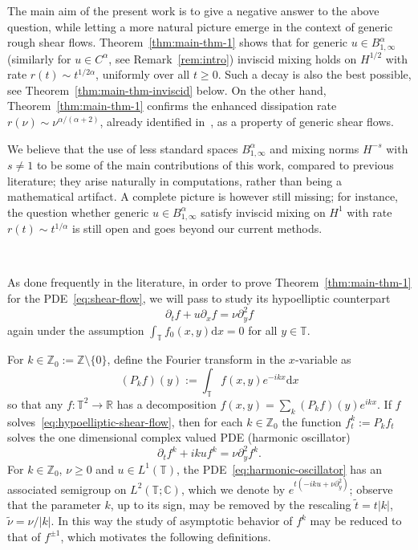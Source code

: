 \documentclass[11pt,oneside,reqno]{amsart}
\newcommand{\assign}{:=}
\newcommand{\mathd}{\mathrm{d}}
\newcommand{\tmtextbf}[1]{\text{{\bfseries{#1}}}}
\numberwithin{equation}{section}
\begin{document}
The main aim of the present work is to give a negative answer to the above
question, while letting a more natural picture emerge in the context of
generic rough shear flows. Theorem~\ref{thm:main-thm-1} shows that for generic
$u \in B^{\alpha}_{1, \infty}$ (similarly for $u \in C^{\alpha}$, see
Remark~\ref{rem:intro}) inviscid mixing holds on $H^{1 / 2}$
with rate $r (t) \sim t^{1 / 2 \alpha}$, uniformly over all $t \geqslant 0$.
Such a decay is also the best possible, see
Theorem~\ref{thm:main-thm-inviscid} below. On the other hand,
Theorem~\ref{thm:main-thm-1} confirms the enhanced dissipation rate $r (\nu)
\sim \nu^{\alpha / (\alpha + 2)}$, already identified
in~{\cite{wei,colombozelati}}, as a property of generic shear flows.

We believe that the use of less standard spaces $B^{\alpha}_{1, \infty}$ and
mixing norms $H^{- s}$ with $s \neq 1$ to be some of the main contributions of
this work, compared to previous literature; they arise naturally in
computations, rather than being a mathematical artifact. A complete picture is
however still missing; for instance, the question whether generic $u \in
B^{\alpha}_{1, \infty}$ satisfy inviscid mixing on $H^1$ with
rate $r (t) \sim t^{1 / \alpha}$ is still open and goes beyond
our current methods.

\

\tmtextbf{Structure of the proof.} As done frequently in the literature, in
order to prove Theorem~\ref{thm:main-thm-1} for the PDE~\eqref{eq:shear-flow},
we will pass to study its hypoelliptic counterpart
\begin{equation}
  \partial_t f + u \partial_x f = \nu \partial_y^2 f
  \label{eq:hypoelliptic-shear-flow}
\end{equation}
again under the assumption $\int_{\mathbb{T}} f_0 (x, y) \mathd x = 0$ for all
$y \in \mathbb{T}$.

For $k \in \mathbb{Z}_0 \assign \mathbb{Z} \setminus \{ 0 \}$, define the
Fourier transform in the $x$-variable as
\[ (P_k f) (y) \assign \int_{\mathbb{T}} f (x, y) e^{- i k x} \mathd x \]
so that any $f : \mathbb{T}^2 \rightarrow \mathbb{R}$ has a decomposition $f
(x, y) = \sum_k (P_k f) (y) e^{i k x}$. If $f$
solves~\eqref{eq:hypoelliptic-shear-flow}, then for each $k \in \mathbb{Z}_0$
the function $f^k_t \assign P_k f_t$ solves the one dimensional complex valued
PDE (harmonic oscillator)
\begin{equation}
  \partial_t f^k + i k u f^k = \nu \partial_y^2 f^k .
  \label{eq:harmonic-oscillator}
\end{equation}
For $k \in \mathbb{Z}_0$, $\nu \geqslant 0$ and $u \in L^1 (\mathbb{T})$, the
PDE~\eqref{eq:harmonic-oscillator} has an associated semigroup on $L^2
(\mathbb{T}; \mathbb{C})$, which we denote by $e^{t (- i k u + \nu
\partial_y^2)}$; observe that the parameter $k$, up to its sign, may be
removed by the rescaling $\tilde{t} = t | k |$, $\tilde{\nu} = \nu / | k |$.
In this way the study of asymptotic behavior of $f^k$ may be reduced to that
of $f^{\pm 1}$, which motivates the following definitions.
\end{document}
